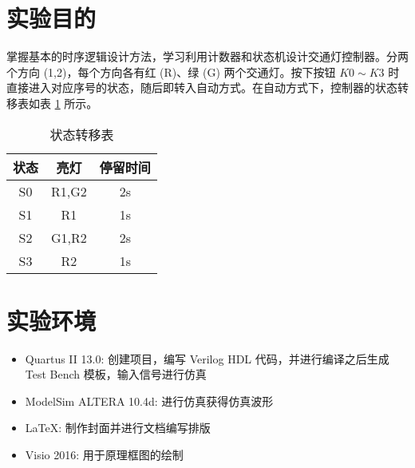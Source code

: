 \documentclass[12pt,AutoFakeBold]{article}
\begin{document}
\maketitle
\setcounter{tocdepth}{2}
\tableofcontents  %

\makeatletter
\begin{center}
	\LARGE \textbf{\textsf{\@problem}}
\end{center}
\makeatother




\section{实验目的}

掌握基本的时序逻辑设计方法，学习利用计数器和状态机设计交通灯控制器。分两个方向 (1,2)，每个方向各有红 (R)、绿 (G) 两个交通灯。按下按钮 $K0\sim K3$ 时直接进入对应序号的状态，随后即转入自动方式。在自动方式下，控制器的状态转移表如表 \ref{table:trans} 所示。


\begin{table}[hbtp]
	\setlength{\abovecaptionskip}{0cm} 
	\setlength{\belowcaptionskip}{-0.2cm}
	\begin{center}
	\caption{状态转移表}
	\begin{tabular}{|c|c|c|}
		\hline
		\textbf{状态} & \textbf{亮灯} & \textbf{停留时间} \\ \hline
		S0          & R1,G2       & 2s            \\ \hline
		S1          & R1          & 1s            \\ \hline
		S2          & G1,R2       & 2s            \\ \hline
		S3          & R2          & 1s            \\ \hline
	\end{tabular}\label{table:trans}
	\end{center}
\end{table}


\section{实验环境}

\begin{itemize}
	\item Quartus II 13.0: 创建项目，编写 Verilog HDL 代码，并进行编译之后生成 Test Bench 模板，输入信号进行仿真
	\item ModelSim ALTERA 10.4d: 进行仿真获得仿真波形
	\item \LaTeX: 制作封面并进行文档编写排版
	\item Visio 2016: 用于原理框图的绘制
\end{itemize}
\end{document}

